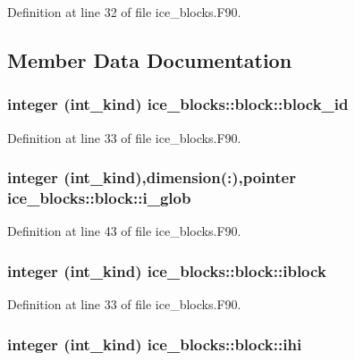 Definition at line 32 of file ice\_\-blocks.F90.

\subsection{Member Data Documentation}
\hypertarget{typeice__blocks_1_1block_a5751ccb322f36de26c169943e22ab873}{
\subsubsection[{block\_\-id}]{\setlength{\rightskip}{0pt plus 5cm}integer (int\_\-kind) {\bf ice\_\-blocks::block::block\_\-id}}}
\label{typeice__blocks_1_1block_a5751ccb322f36de26c169943e22ab873}


Definition at line 33 of file ice\_\-blocks.F90.\hypertarget{typeice__blocks_1_1block_a42fd3473e2b856717381b5511eafa8af}{
\subsubsection[{i\_\-glob}]{\setlength{\rightskip}{0pt plus 5cm}integer (int\_\-kind),dimension(:),pointer {\bf ice\_\-blocks::block::i\_\-glob}}}
\label{typeice__blocks_1_1block_a42fd3473e2b856717381b5511eafa8af}


Definition at line 43 of file ice\_\-blocks.F90.\hypertarget{typeice__blocks_1_1block_a9c4a04686c173792b32836f6394f9479}{
\subsubsection[{iblock}]{\setlength{\rightskip}{0pt plus 5cm}integer (int\_\-kind) {\bf ice\_\-blocks::block::iblock}}}
\label{typeice__blocks_1_1block_a9c4a04686c173792b32836f6394f9479}


Definition at line 33 of file ice\_\-blocks.F90.\hypertarget{typeice__blocks_1_1block_a14b021a5da7afb6e1ff5e7768c31e522}{
\subsubsection[{ihi}]{\setlength{\rightskip}{0pt plus 5cm}integer (int\_\-kind) {\bf ice\_\-blocks::block::ihi}}}
\label{typeice__blocks_1_1block_a14b021a5da7afb6e1ff5e7768c31e522}


